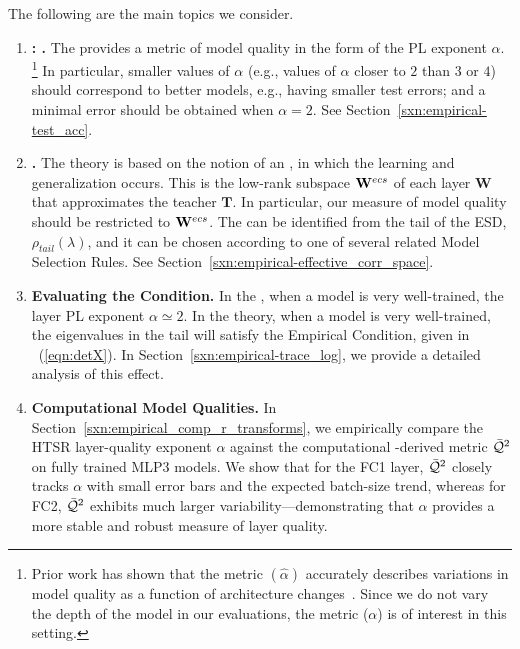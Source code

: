 The following are the main topics we consider.

\begin{enumerate}[label=6.\arabic*]
\item
\textbf{\ModelQuality: \HTSR \Phenomenology.}
The \HTSR \Phenomenology provides a metric of model quality in the form of the PL exponent $\alpha$.%
\footnote{Prior work has shown that the \ALPHAHAT metric $(\hat{\alpha})$ accurately describes variations in model 
quality as a function of architecture changes~\cite{MM21a_simpsons_TR}. Since we do not vary the depth of the model in 
our evaluations, the \ALPHA metric ($\alpha$) is of interest in this setting.} 
In particular, smaller values of $\alpha$ (e.g., 
values of $\alpha$ closer to $2$ than $3$ or $4$) should correspond to better models, e.g., having smaller test errors; and
a minimal error should be obtained when $\alpha=2$.
See Section~\ref{sxn:empirical-test_acc}.
\item 
\textbf{\EffectiveCorrelationSpace.}
The \SETOL theory is based on the notion of an \EffectiveCorrelationSpace, in which the learning and generalization occurs. 
This is the low-rank subspace $\mathbf{W}^{ecs}$ of each layer $\mathbf{W}$ that approximates the teacher $\mathbf{T}$.
In particular, 
our measure of model quality should be restricted to $\mathbf{W}^{ecs}$.
The \EffectiveCorrelationSpace can be identified from the tail of the ESD, $\rho_{tail}(\lambda)$, and it can be chosen according to one of several related Model Selection Rules.
See Section~\ref{sxn:empirical-effective_corr_space}.
\item 
\textbf{Evaluating the \TRACELOG  Condition.}
In the \HTSR \Phenomenology, when a model is very well-trained, the layer PL exponent $\alpha\simeq 2$.
In the \SETOL theory, when a model is very well-trained, the eigenvalues in the tail will satisfy the Empirical \TRACELOG  Condition, given in \EQN~(\ref{eqn:detX}).
In Section~\ref{sxn:empirical-trace_log}, we provide a detailed analysis of this effect.
\item
\textbf{Computational Model Qualities.}
In Section~\ref{sxn:empirical_comp_r_transforms}, we empirically compare the HTSR layer-quality exponent $\alpha$ against the computational \RTransform-derived metric $\bar{\mathcal{Q}}^{2}$ on fully trained MLP3 models. We show that for the FC1 layer, $\bar{\mathcal{Q}}^{2}$ closely tracks $\alpha$ with small error bars and the expected batch-size trend, whereas for FC2, $\bar{\mathcal{Q}}^{2}$ exhibits much larger variability—demonstrating that $\alpha$ provides a more stable and robust measure of layer quality.  

\end{enumerate}
